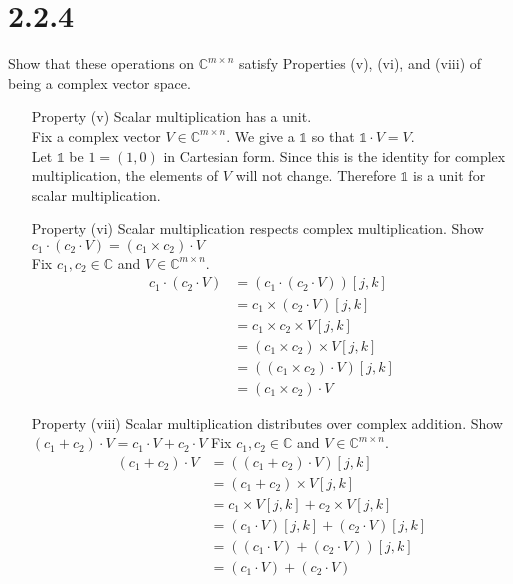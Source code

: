 \documentclass[11pt]{article}
\begin{document}

\section{2.2.4} Show that these operations on $\mathbb{C}^{m \times n}$ satisfy Properties (v), (vi), and (viii) of being a complex vector space.

\begin{enumerate}
\item[Property (v)] Scalar multiplication has a unit. \\ 
	Fix a complex vector $V \in \mathbb{C}^{m \times n}$.
		We give a $\mathds{1}$ so that $\mathds{1} \cdot V = V$. \\
		Let $\mathds{1}$ be $1 = (1,0)$ in Cartesian form. 
		Since this is the identity for complex multiplication, the elements of $V$ will not change. Therefore $\mathds{1}$ is a unit for scalar multiplication.
		\newpage
\item[Property (vi)] Scalar multiplication respects complex multiplication. 
	Show $c_1 \cdot (c_2 \cdot V) = (c_1 \times c_2) \cdot V$ \\
		Fix $c_1, c_2 \in \mathbb{C}$ and $V \in \mathbb{C}^{m \times n}$. 
		\begin{align*}
			c_1 \cdot (c_2 \cdot V) 
			&= (c_1 \cdot (c_2 \cdot V))[j,k] \\
			&= c_1 \times (c_2 \cdot V)[j,k] \\
			&= c_1 \times c_2 \times V[j,k] \\
			&= (c_1 \times c_2) \times V[j,k] \\
			&= ((c_1 \times c_2) \cdot V)[j,k] \\
			&= (c_1 \times c_2) \cdot V
		\end{align*}

\item[Property (viii)] Scalar multiplication distributes over complex addition. 
	Show $(c_1 + c_2) \cdot V = c_1 \cdot V + c_2 \cdot V$
		Fix $c_1, c_2 \in \mathbb{C}$ and $V \in \mathbb{C}^{m \times n}$. 
		\begin{align*}
			(c_1 + c_2) \cdot V 
			&= ((c_1 + c_2) \cdot V)[j,k] \\
			&= (c_1 + c_2) \times V[j,k] \\
			&= c_1 \times V[j,k] + c_2 \times V[j,k]\\
			&= (c_1 \cdot V)[j,k] + (c_2 \cdot V)[j,k]\\
			&= ((c_1 \cdot V) + (c_2 \cdot V))[j,k] \\ 
			&= (c_1 \cdot V) + (c_2 \cdot V)
		\end{align*}



\end{enumerate}
\end{document}
